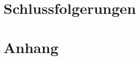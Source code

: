 \documentclass{hwz}
\begin{document}


\makeBeginMain









\section{Schlussfolgerungen}

% 

\section{Anhang}



\end{document}
